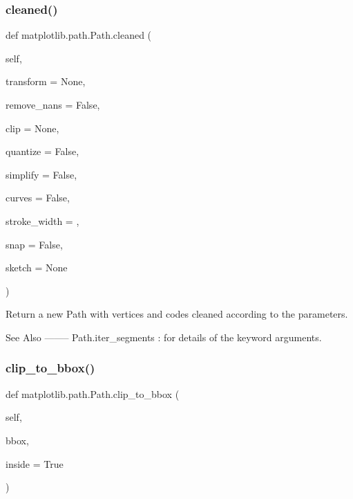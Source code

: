 \subsubsection{\texorpdfstring{cleaned()}{cleaned()}}
{\footnotesize\ttfamily def matplotlib.\+path.\+Path.\+cleaned (\begin{DoxyParamCaption}\item[{}]{self,  }\item[{}]{transform = {\ttfamily None},  }\item[{}]{remove\+\_\+nans = {\ttfamily False},  }\item[{}]{clip = {\ttfamily None},  }\item[{}]{quantize = {\ttfamily False},  }\item[{}]{simplify = {\ttfamily False},  }\item[{}]{curves = {\ttfamily False},  }\item[{}]{stroke\+\_\+width = {},  }\item[{}]{snap = {\ttfamily False},  }\item[{}]{sketch = {\ttfamily None} }\end{DoxyParamCaption})}

\begin{DoxyVerb}Return a new Path with vertices and codes cleaned according to the
parameters.

See Also
--------
Path.iter_segments : for details of the keyword arguments.
\end{DoxyVerb}
 \mbox{\label{classmatplotlib_1_1path_1_1Path_a9cadda4af3011a672a4c2bde5f396446}} 
\subsubsection{\texorpdfstring{clip\+\_\+to\+\_\+bbox()}{clip\_to\_bbox()}}
{\footnotesize\ttfamily def matplotlib.\+path.\+Path.\+clip\+\_\+to\+\_\+bbox (\begin{DoxyParamCaption}\item[{}]{self,  }\item[{}]{bbox,  }\item[{}]{inside = {\ttfamily True} }\end{DoxyParamCaption})}

